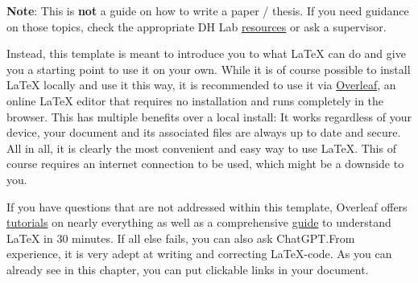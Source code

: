 \documentclass[12pt, a4paper, ngerman, bidi=default]{article}
\begin{document}
\textbf{Note}: This is \textbf{not} a guide on how to write a paper / thesis. If you need guidance on those topics, check the appropriate DH
Lab \href{https://dhlab.philhist.unibas.ch/en/master-course/seminar-masterarbeit-masterpruefung/}{resources} or ask a supervisor.

Instead, this template is meant to introduce you to what LaTeX can do and give you a starting point to use it on your own. While it is of course possible to install LaTeX locally and use it this way, it is recommended to use it via \href{https://www.overleaf.com}{Overleaf}, an online LaTeX editor that requires no installation and runs completely in the browser. This has multiple benefits over a local install: It works regardless of your device, your document and its associated files are always up to date and secure. All in all, it is clearly the most convenient and easy way to use LaTeX. This of course requires an internet connection to be used, which might be a downside to you.

If you have questions that are not addressed within this template, Overleaf offers \href{https://www.overleaf.com/learn/latex/Tutorials}{tutorials} on nearly everything as well as a comprehensive \href{https://www.overleaf.com/learn/latex/Learn_LaTeX_in_30_minutes}{guide} to understand LaTeX in 30 minutes. If all else fails, you can also ask ChatGPT.\@ From experience, it is very adept at writing and correcting LaTeX-code. As you can already see in this chapter, you can put clickable links in your document.


\end{document}
